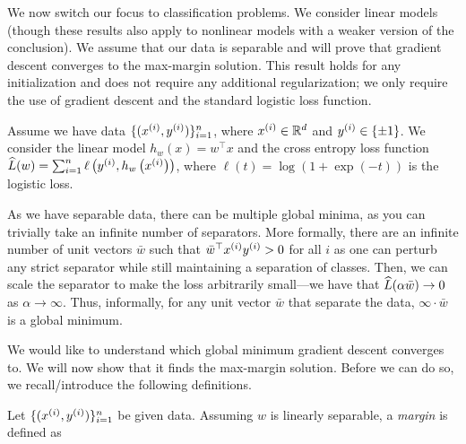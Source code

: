 We now switch our focus to classification problems. We consider linear models (though these results also apply to nonlinear models with a weaker version of the conclusion). We assume that our data is separable and will prove that gradient descent converges to the max-margin solution. This result holds for any initialization and does not require any additional regularization; we only require the use of gradient descent and the standard logistic loss function.

Assume we have data \(\{(x\sp{i}, y\sp{i}) \}_{i=1}^n \), where \(x\sp{i} \in \R^d\) and \(y\sp{i} \in \{\pm 1 \}\). We consider the linear model \( h_w(x) = w^\top x\) and the cross entropy loss function \(\hatL (w) = \sum_{i=1}^n \ell\left(y\sp{i}, h_w\l (x\sp{i} \r )\right)\), where \( \ell(t) = \log(1 + \exp(-t))\) is the logistic loss.

As we have separable data, there can be multiple global minima, as you can trivially take an infinite number of separators. More formally, there are an infinite number of unit vectors \(\bar{w}\) such that $\bar{w}^\top x\sp{i} y\sp{i} > 0$ for all $i$ as one can perturb any strict separator  while still maintaining a separation of classes. Then, we can scale the separator to make the loss arbitrarily small---we have that \( \hatL(\alpha \bar{w}) \to 0\) as \( \alpha \to \infty\). Thus, informally, for any unit vector $\bar{w}$ that separate the data, $\infty \cdot \bar{w}$ is a global minimum. %

We would like to understand which global minimum gradient descent converges to. We will now show that it finds the max-margin solution. Before we can do so, we recall/introduce the following definitions.

\begin{definition}[Margin]
Let \(\{(x\sp{i}, y\sp{i}) \}_{i=1}^n \) be given data. Assuming \(w\) is linearly separable, a \textit{margin} is defined as
\end{definition}

